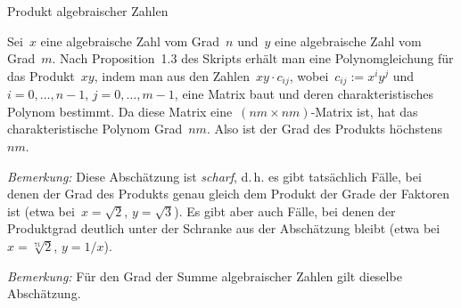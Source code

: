 \documentclass{algblatt}
\begin{document}
\begin{aufgabe}{Produkt algebraischer Zahlen}
\begin{loesungE}
\item Sei~$x$ eine algebraische Zahl vom Grad~$n$ und~$y$ eine algebraische
Zahl vom Grad~$m$. Nach Proposition~1.3 des Skripts erhält man eine
Polynomgleichung für das Produkt~$xy$, indem man aus den Zahlen~$xy \cdot
c_{ij}$, wobei~$c_{ij} := x^i y^j$ und~$i = 0,\ldots,n-1$, $j = 0,\ldots,m-1$,
eine Matrix baut und deren charakteristisches Polynom bestimmt. Da diese Matrix
eine~$(nm \times nm)$-Matrix ist, hat das charakteristische Polynom Grad~$nm$.
Also ist der Grad des Produkts höchstens~$nm$.

\emph{Bemerkung:} Diese Abschätzung ist \emph{scharf}, d.\,h. es gibt
tatsächlich Fälle, bei denen der Grad des Produkts genau gleich dem Produkt der
Grade der Faktoren ist (etwa bei~$x = \sqrt{2}$, $y = \sqrt{3}$). Es gibt aber
auch Fälle, bei denen der Produktgrad deutlich unter der Schranke aus der
Abschätzung bleibt (etwa bei~$x = \sqrt[71]{2}$, $y = 1/x$).

\emph{Bemerkung:} Für den Grad der Summe algebraischer Zahlen gilt dieselbe
Abschätzung.
\end{loesungE}
\end{aufgabe}
\end{document}
